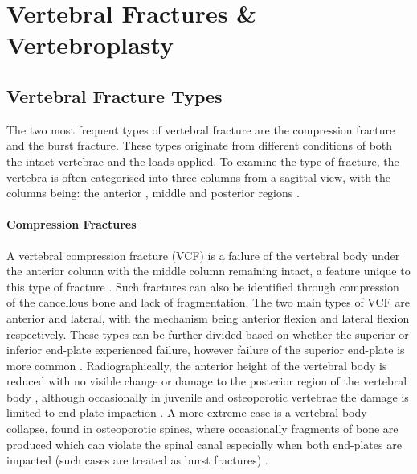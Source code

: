\section{Vertebral Fractures \&
Vertebroplasty}\label{vertebral-fractures-vertebroplasty}

\subsection{Vertebral Fracture Types}\label{vertebral-fracture-types}

The two most frequent types of vertebral fracture are the compression
fracture and the burst fracture. These types originate from different
conditions of both the intact vertebrae and the loads applied. To
examine the type of fracture, the vertebra is often categorised into
three columns from a sagittal view, with the columns being: the anterior
, middle and posterior regions \cite{Denis1983}.

\paragraph{Compression Fractures}\label{compression-fractures}

A vertebral compression fracture (VCF) is a failure of the vertebral
body under the anterior column with the middle column remaining intact,
a feature unique to this type of fracture \cite{Denis1983}. Such fractures can
also be identified through compression of the cancellous bone and lack
of fragmentation. The two main types of VCF are anterior and lateral,
with the mechanism being anterior flexion and lateral flexion
respectively. These types can be further divided based on whether the
superior or inferior end-plate experienced failure, however failure of
the superior end-plate is more common \cite{Denis1983}. Radiographically, the
anterior
height of the vertebral body is reduced with no visible change or damage
to the posterior region of the vertebral body \cite{Denis1983}, although
occasionally in juvenile and osteoporotic vertebrae the damage is
limited to end-plate impaction \cite{Magerl1994}. A more extreme case
is a
vertebral body collapse, found in osteoporotic spines, where
occasionally fragments of bone are produced which can violate the spinal
canal especially when both end-plates are impacted (such cases are
treated as burst fractures) \cite{Magerl1994}.

